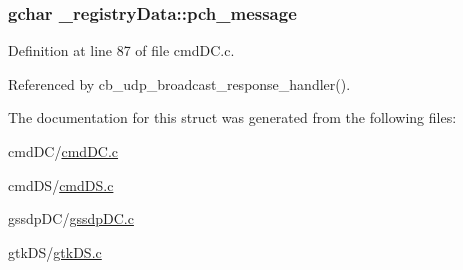 \hypertarget{struct__registry_data_aad089cfecaeccff2c9c6bb7a97d46706}{}
\subsubsection[{pch\+\_\+message}]{\setlength{\rightskip}{0pt plus 5cm}gchar \+\_\+registry\+Data\+::pch\+\_\+message}\label{struct__registry_data_aad089cfecaeccff2c9c6bb7a97d46706}


Definition at line 87 of file cmd\+D\+C.\+c.



Referenced by cb\+\_\+udp\+\_\+broadcast\+\_\+response\+\_\+handler().



The documentation for this struct was generated from the following files\+:\begin{DoxyCompactItemize}
\item 
cmd\+D\+C/\hyperlink{cmd_d_c_8c}{cmd\+D\+C.\+c}\item 
cmd\+D\+S/\hyperlink{cmd_d_s_8c}{cmd\+D\+S.\+c}\item 
gssdp\+D\+C/\hyperlink{gssdp_d_c_8c}{gssdp\+D\+C.\+c}\item 
gtk\+D\+S/\hyperlink{gtk_d_s_8c}{gtk\+D\+S.\+c}\end{DoxyCompactItemize}
